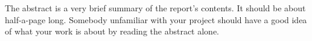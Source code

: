 The abstract is a very brief summary of the report's contents. It should be about half-a-page long. Somebody unfamiliar with your project should have a good idea of what your work is about by reading the abstract alone.